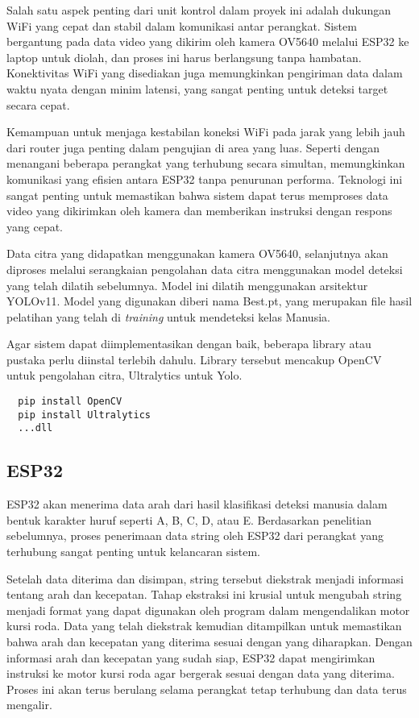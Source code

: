 Salah satu aspek penting dari unit kontrol dalam proyek ini adalah dukungan WiFi yang cepat dan stabil dalam komunikasi antar perangkat. Sistem bergantung pada data video yang dikirim oleh kamera OV5640 melalui ESP32 ke laptop untuk diolah, dan proses ini harus berlangsung tanpa hambatan. Konektivitas WiFi yang disediakan juga memungkinkan pengiriman data dalam waktu nyata dengan minim latensi, yang sangat penting untuk deteksi target secara cepat.

Kemampuan untuk menjaga kestabilan koneksi WiFi pada jarak yang lebih jauh dari router juga penting dalam pengujian di area yang luas. Seperti dengan menangani beberapa perangkat yang terhubung secara simultan, memungkinkan komunikasi yang efisien antara ESP32 tanpa penurunan performa. Teknologi ini sangat penting untuk memastikan bahwa sistem dapat terus memproses data video yang dikirimkan oleh kamera dan memberikan instruksi dengan respons yang cepat.

Data citra yang didapatkan menggunakan kamera OV5640, selanjutnya akan diproses melalui serangkaian pengolahan data citra menggunakan model deteksi yang telah dilatih sebelumnya. Model ini dilatih menggunakan arsitektur YOLOv11. Model yang digunakan diberi nama Best.pt, yang merupakan file hasil pelatihan yang telah di \emph{training} untuk mendeteksi kelas Manusia.

Agar sistem dapat diimplementasikan dengan baik, beberapa library atau pustaka perlu diinstal terlebih dahulu. Library tersebut mencakup OpenCV untuk pengolahan citra, Ultralytics untuk Yolo.

\begin{lstlisting}
  pip install OpenCV
  pip install Ultralytics
  ...dll
\end{lstlisting}

\subsection{ESP32}
\label{subsec:ESP32}
ESP32 akan menerima data arah dari hasil klasifikasi deteksi manusia dalam bentuk karakter huruf seperti A, B, C, D, atau E. Berdasarkan penelitian sebelumnya, proses penerimaan data string oleh ESP32 dari perangkat yang terhubung sangat penting untuk kelancaran sistem.

Setelah data diterima dan disimpan, string tersebut diekstrak menjadi informasi tentang arah dan kecepatan. Tahap ekstraksi ini krusial untuk mengubah string menjadi format yang dapat digunakan oleh program dalam mengendalikan motor kursi roda. Data yang telah diekstrak kemudian ditampilkan untuk memastikan bahwa arah dan kecepatan yang diterima sesuai dengan yang diharapkan. Dengan informasi arah dan kecepatan yang sudah siap, ESP32 dapat mengirimkan instruksi ke motor kursi roda agar bergerak sesuai dengan data yang diterima. Proses ini akan terus berulang selama perangkat tetap terhubung dan data terus mengalir.


